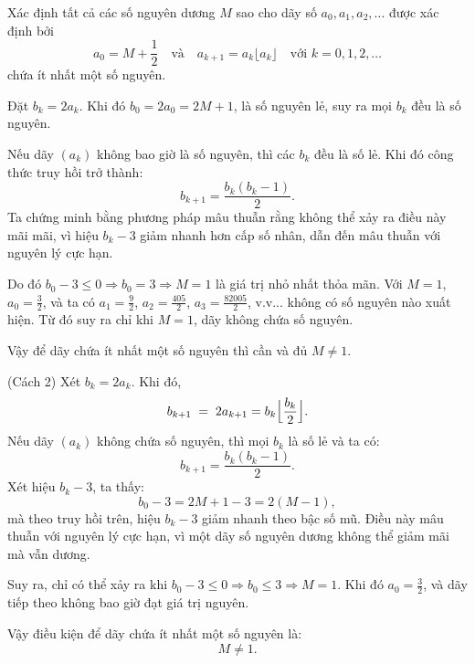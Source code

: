 \documentclass[../03-arithmetic-functions.tex]{subfiles}
\begin{document}
\begin{example*}
    Xác định tất cả các số nguyên dương \( M \) sao cho dãy số \( a_0, a_1, a_2, \dots \) được xác định bởi  
    \[
        a_0 = M + \frac{1}{2} \quad \text{và} \quad a_{k+1} = a_k \lfloor a_k \rfloor \quad \text{với } k = 0, 1, 2, \dots
    \]
    chứa ít nhất một số nguyên.
\end{example*}

\begin{story*}
    Đặt \( b_k = 2a_k \). Khi đó \( b_0 = 2a_0 = 2M + 1 \), là số nguyên lẻ, suy ra mọi \( b_k \) đều là số nguyên. 

    Nếu dãy \( (a_k) \) không bao giờ là số nguyên, thì các \( b_k \) đều là số lẻ. Khi đó công thức truy hồi trở thành:
    \[
        b_{k+1} = \frac{b_k(b_k - 1)}{2}.
    \]
    Ta chứng minh bằng phương pháp mâu thuẫn rằng không thể xảy ra điều này mãi mãi, vì hiệu \( b_k - 3 \) giảm nhanh hơn cấp số nhân, dẫn đến mâu thuẫn với nguyên lý cực hạn.

    Do đó \( b_0 - 3 \le 0 \Rightarrow b_0 = 3 \Rightarrow M = 1 \) là giá trị nhỏ nhất thỏa mãn. Với \( M = 1 \), \( a_0 = \tfrac{3}{2} \), và ta có \( a_1 = \tfrac{9}{2} \), \( a_2 = \tfrac{405}{2} \), \( a_3 = \tfrac{82005}{2} \), v.v... không có số nguyên nào xuất hiện. Từ đó suy ra chỉ khi \( M = 1 \), dãy không chứa số nguyên.

    Vậy để dãy chứa ít nhất một số nguyên thì cần và đủ \( \boxed{M \ne 1} \).
\end{story*}

\bigbreak

\begin{soln}(Cách 2)\footnotemark
    Xét \( b_k = 2a_k \). Khi đó,    
    \[
        b_{k+1} \;=\; 2a_{k+1} = b_k \Bigl\lfloor \frac{b_k}{2} \Bigr\rfloor.
    \]
    Nếu dãy \( (a_k) \) không chứa số nguyên, thì mọi \( b_k \) là số lẻ và ta có:
    \[
        b_{k+1} = \frac{b_k (b_k - 1)}{2}.
    \]
    Xét hiệu \( b_k - 3 \), ta thấy:
    \[
        b_0 - 3 = 2M + 1 - 3 = 2(M - 1),
    \]
    mà theo truy hồi trên, hiệu \( b_k - 3 \) giảm nhanh theo bậc số mũ. Điều này mâu thuẫn với nguyên lý cực hạn, vì một dãy số nguyên dương không thể giảm mãi mà vẫn dương.

    Suy ra, chỉ có thể xảy ra khi \( b_0 - 3 \le 0 \Rightarrow b_0 \le 3 \Rightarrow M = 1 \). Khi đó \( a_0 = \tfrac{3}{2} \), và dãy tiếp theo không bao giờ đạt giá trị nguyên.

    Vậy điều kiện để dãy chứa ít nhất một số nguyên là:
    \[
        \boxed{M \ne 1}.
    \]
\end{soln}

\end{document}
